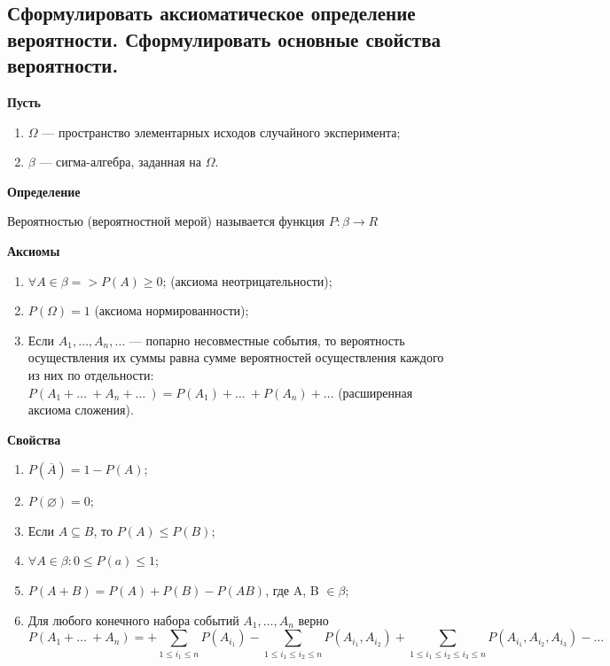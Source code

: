 \subsection{Сформулировать аксиоматическое определение вероятности. Сформулировать основные свойства вероятности.}

\textbf{Пусть} 

\begin{enumerate}
	\item $\Omega$ --- пространство элементарных исходов случайного эксперимента;
	\item $\beta$ --- сигма-алгебра, заданная на $\Omega$.
\end{enumerate}

\textbf{Определение}

Вероятностью (вероятностной мерой) называется функция $P: \beta \rightarrow R$

\textbf{Аксиомы}

\begin{enumerate}
	\item $\forall A \in \beta => P(A) \geqslant 0$; (аксиома неотрицательности);
	\item $P(\Omega) = 1$ (аксиома нормированности);
	\item Если $A_1, \dots, A_n, \dots$ --- попарно несовместные события, то вероятность осуществления их суммы равна сумме вероятностей осуществления каждого из них по отдельности: $P(A_1 + \dots\ + A_n + \dots\ ) = P(A_1) + \dots\ + P(A_n) + \dots$ (расширенная аксиома сложения). 
\end{enumerate}

\textbf{Свойства}

\begin{enumerate}
	\item $P(\overline{A}) = 1 - P(A)$;
	\item $P(\varnothing) = 0$;
	\item Если $A \subseteq B$, то $P(A) \leqslant P(B)$;
	\item $\forall A \in \beta: 0 \leqslant P(a) \leqslant 1$;
	\item $P(A + B) = P(A) + P(B) - P(AB)$, где A, B $\in \beta$;
	\item Для любого конечного набора событий $A_1, \dots, A_n$ верно
	\begin{equation}
		P(A_1 + \dots\ + A_n) = + \sum\limits_{1 \leqslant i_1 \leqslant n}P(A_{i_1}) - \sum\limits_{1 \leqslant i_1 \leqslant i_2 \leqslant n}P(A_{i_1}, A_{i_2}) + \sum\limits_{1 \leqslant i_1 \leqslant i_2 \leqslant i_3 \leqslant n}P(A_{i_1}, A_{i_2}, A_{i_3}) - \dots
	\end{equation}
\end{enumerate}

